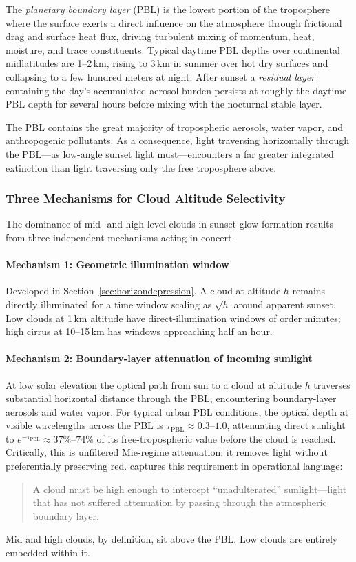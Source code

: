 \documentclass[11pt,a4paper]{article}
\begin{document}
The \emph{planetary boundary layer} (PBL) is the lowest portion of the troposphere where the surface exerts a direct influence on the atmosphere through frictional drag and surface heat flux, driving turbulent mixing of momentum, heat, moisture, and trace constituents. Typical daytime PBL depths over continental midlatitudes are 1--2\,km, rising to 3\,km in summer over hot dry surfaces and collapsing to a few hundred meters at night. After sunset a \emph{residual layer} containing the day's accumulated aerosol burden persists at roughly the daytime PBL depth for several hours before mixing with the nocturnal stable layer.

The PBL contains the great majority of tropospheric aerosols, water vapor, and anthropogenic pollutants. As a consequence, light traversing horizontally through the PBL---as low-angle sunset light must---encounters a far greater integrated extinction than light traversing only the free troposphere above.

\subsubsection{Three Mechanisms for Cloud Altitude Selectivity}

The dominance of mid- and high-level clouds in sunset glow formation results from three independent mechanisms acting in concert.

\paragraph{Mechanism 1: Geometric illumination window} Developed in Section~\ref{sec:horizondepression}. A cloud at altitude $h$ remains directly illuminated for a time window scaling as $\sqrt{h}$ around apparent sunset. Low clouds at 1\,km altitude have direct-illumination windows of order minutes; high cirrus at 10--15\,km has windows approaching half an hour.

\paragraph{Mechanism 2: Boundary-layer attenuation of incoming sunlight} At low solar elevation the optical path from sun to a cloud at altitude $h$ traverses substantial horizontal distance through the PBL, encountering boundary-layer aerosols and water vapor. For typical urban PBL conditions, the optical depth at visible wavelengths across the PBL is $\tau_{\text{PBL}} \approx 0.3$--$1.0$, attenuating direct sunlight to $e^{-\tau_{\text{PBL}}} \approx 37\%$--$74\%$ of its free-tropospheric value before the cloud is reached. Critically, this is unfiltered Mie-regime attenuation: it removes light without preferentially preserving red. \citet{corfidi2014colors} captures this requirement in operational language:
\begin{quote}
A cloud must be high enough to intercept ``unadulterated'' sunlight---light that has not suffered attenuation by passing through the atmospheric boundary layer.
\end{quote}
Mid and high clouds, by definition, sit above the PBL. Low clouds are entirely embedded within it.
\end{document}
